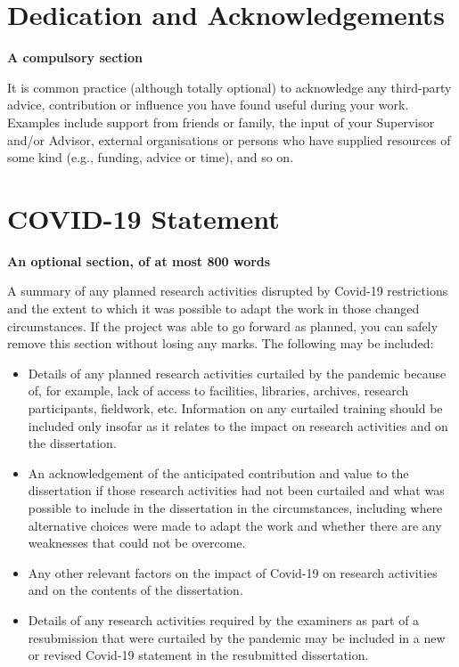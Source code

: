 \documentclass[ oneside,%
                    author={Joshua Felmeden},
                    degree={MEng},
                     title={Semantic Analysis of Financial Headlines Based on Realised Stock Returns},
                  subtitle={}]{dissertation}
\begin{document}


\chapter*{Dedication and Acknowledgements}

{\bf A compulsory section}
\vspace{1cm} 

\noindent
It is common practice (although totally optional) to acknowledge any
third-party advice, contribution or influence you have found useful
during your work.  Examples include support from friends or family, 
the input of your Supervisor and/or Advisor, external organisations 
or persons who  have supplied resources of some kind (e.g., funding, 
advice or time), and so on.




\chapter*{COVID-19 Statement}

{\bf An optional section, of at most 800 words} 
\vspace{1cm} 

\noindent
A summary of any planned research activities disrupted by Covid-19 restrictions and the extent to which it was possible to adapt the work in those changed circumstances. If the project was able to go forward as planned, you can safely remove this section without losing any marks. The following may be included:

\begin{itemize}
\item Details of any planned research activities curtailed by the pandemic because of, for example, lack of access to facilities, libraries, archives, research participants, fieldwork, etc. Information on any curtailed training should be included only insofar as it relates to the impact on research activities and on the dissertation.

\item An acknowledgement of the anticipated contribution and value to the dissertation if those research activities had not been curtailed and what was possible to include in the dissertation in the circumstances, including where alternative choices were made to adapt the work and whether there are any weaknesses that could not be overcome.

\item Any other relevant factors on the impact of Covid-19 on research activities and on the contents of the dissertation.

\item Details of any research activities required by the examiners as part of a resubmission that were curtailed by the pandemic may be included in a new or revised Covid-19 statement in the resubmitted dissertation.
\end{itemize}
\end{document}
